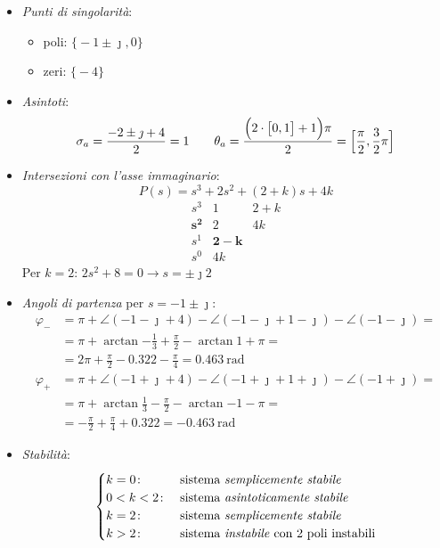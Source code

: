 \begin{itemize}
	\item \emph{Punti di singolarità}:
		\begin{itemize}
			\item poli: \(\bigl\{-1\pm\jmath,0\bigr\}\)
			\item zeri: \(\bigl\{-4\bigr\}\)
		\end{itemize}
	\item \emph{Asintoti}:
		\[
			\sigma_a = \frac{-2\pm\jmath+4}{2} = 1 \qquad
			\theta_a = \frac{\Bigl(2\cdot\bigl[0,1\bigr]+1\Bigr)\pi}{2} = \Bigl[\frac{\pi}{2},\frac{3}{2}\pi\Bigr]
		\]
	\item \emph{Intersezioni con l'asse immaginario}:
		\[
			P(s) = s^3 + 2s^2 +(2+k)s +4k
		\]
		\[\begin{array}{r|rr}
			s^3 & 1 & 2+k 	   \\
			\bm{s^2} & 2 & 4k  \\
			s^1 & \bm{2-k} 	   \\
			s^0 & 4k
		\end{array}\]
		Per \(k=2\): \(2s^2+8=0 \rightarrow s=\pm\jmath2\)
	\item \emph{Angoli di partenza} per \(s=-1\pm\jmath\):
		\begin{align*}
			\varphi_- &= \pi +\angle(-1-\jmath+4) -\angle(-1-\jmath+1-\jmath) -\angle(-1-\jmath) = \\
				  &= \pi +\arctan{-\frac{1}{3}} +\frac{\pi}{2} -\arctan{1} +\pi = \\
				  &= 2\pi +\frac{\pi}{2} -0.322 -\frac{\pi}{4} = \SI{0.463}{\radian} \\
			\varphi_+ &= \pi +\angle(-1+\jmath+4) -\angle(-1+\jmath+1+\jmath) -\angle(-1+\jmath) = \\
				  &= \pi +\arctan{\frac{1}{3}} -\frac{\pi}{2} -\arctan{-1} -\pi = \\
				  &= -\frac{\pi}{2} +\frac{\pi}{4} +0.322 = \SI{-0.463}{\radian}
		\end{align*}
	\item \emph{Stabilità}:
		\[\begin{cases}
			k = 0\colon & \text{sistema \emph{semplicemente stabile}} \\
			0 < k < 2\colon & \text{sistema \emph{asintoticamente stabile}} \\
			k = 2\colon & \text{sistema \emph{semplicemente stabile}} \\
			k > 2\colon & \text{sistema \emph{instabile} con 2 poli instabili}
		\end{cases}\]
\end{itemize}

